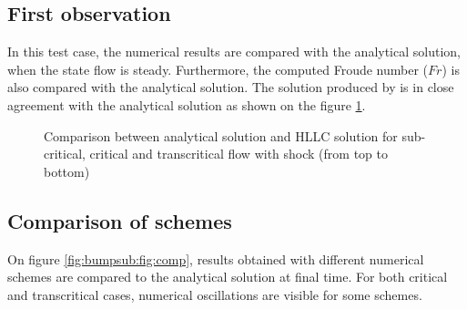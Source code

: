 \subsection{First observation}

In this test case, the numerical results are compared with the
analytical solution, when the state flow is steady. Furthermore, the computed
Froude number ($Fr$) is also
compared with the analytical solution.
The solution produced by  is in close agreement with
the analytical solution as shown on the
figure \ref{fig:bumpsub:fig:hfr}.


\begin{figure}[H]
\begin{minipage}[t]{0.5\textwidth}
 \centering
\end{minipage}%
\begin{minipage}[t]{0.5\textwidth}
 \centering
\end{minipage}
\begin{minipage}[t]{0.5\textwidth}
 \centering
\end{minipage}%
\begin{minipage}[t]{0.5\textwidth}
 \centering
\end{minipage}
\begin{minipage}[t]{0.5\textwidth}
 \centering
\end{minipage}%
\begin{minipage}[t]{0.5\textwidth}
 \centering
\end{minipage}
 \caption{Comparison between analytical solution and  HLLC
 solution for sub-critical, critical and transcritical flow with shock (from top to bottom)}\label{fig:bumpsub:fig:hfr}
\end{figure}


\subsection{Comparison of schemes}
On figure \ref{fig:bumpsub:fig:comp}, results obtained with different numerical schemes are compared to the analytical solution at final time. For both critical and transcritical cases, numerical oscillations are visible for some schemes.

